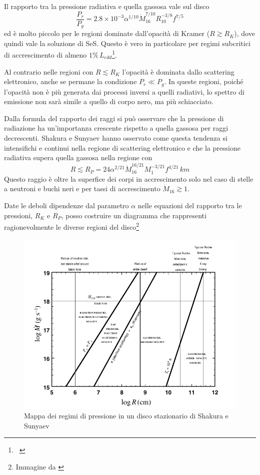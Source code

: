 \documentclass[a4paperbi]{article}
\begin{document}
	Il rapporto tra la pressione radiativa e quella gassosa vale sul disco
	\begin{equation}
		\frac{P_r}{P_g}=2.8\times10^{-3}\alpha^{1/10}\dot{M}^{7/10}_{16}R^{-3/8}_{10}f^{7/5}
	\end{equation}
ed è molto piccolo per le regioni dominate dall'opacità di Kramer ($R\gtrsim R_K$), dove quindi vale la soluzione di SeS. Questo è vero in particolare per regimi subcritici di accrescimento di almeno $1\%\,L_{edd}$\footnote{~\cite{ShakuraSunyaev1973}}.
	
	Al contrario nelle regioni con $R\lesssim R_K$ l'opacità è dominata dallo scattering elettronico, anche se permane la condizione $P_r\ll P_g$. In queste regioni, poiché l'opacità non è più generata dai processi inversi a quelli radiativi, lo spettro di emissione non sarà simile a quello di corpo nero, ma più schiacciato.
	
	Dalla formula del rapporto dei raggi si può osservare che la pressione di radiazione ha un'importanza crescente rispetto a quella gassosa per raggi decrescenti. Shakura e Sunyaev hanno osservato come questa tendenza si intensifichi e continui nella regione di scattering elettronico e che la pressione radiativa supera quella gassosa nella regione con
	\begin{equation}
		R\lesssim R_P=24\alpha^{2/21}\dot{M}^{16/21}_{16}M^{-3/21}_1f^{4/21}\,km
	\end{equation}
	Questo raggio è oltre la superfice dei corpi in accrescimento solo nel caso di stelle a neutroni e buchi neri e per tassi di accrescimento $\dot{M}_{16}\gtrsim 1$.
	
	Date le deboli dipendenze dal parametro $\alpha$ nelle equazioni del rapporto tra le pressioni, $R_K$ e $R_P$, posso costruire un diagramma che rappresenti ragionevolmente le diverse regioni del disco\footnote{Immagine da \cite{FrankKingRaineAccretionPower}}
	
	\begin{figure}[H]
		\centering
		\includegraphics[width=1\linewidth]{MappaPressione}
		\caption{Mappa dei regimi di pressione in un disco stazionario di Shakura e Sunyaev}
		\label{fig:MappaPressione}
	\end{figure}
	
\end{document}
